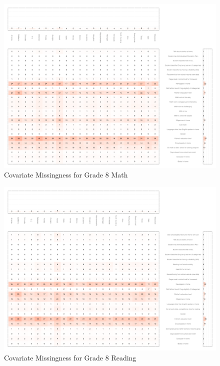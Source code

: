 \documentclass[letterpaper,12p,twoside]{article} %
\begin{document}
\begin{figure}[h]
\begin{center}
\includegraphics[width=\textwidth]{../Figures2009/g8math-missing.pdf}
\caption{Covariate Missingness for Grade 8 Math}
\label{fig:g8math:missing}
\end{center}
\end{figure}

\begin{figure}[h]
\begin{center}
\includegraphics[width=\textwidth]{../Figures2009/g8read-missing.pdf}
\caption{Covariate Missingness for Grade 8 Reading}
\label{fig:g8reading:missing}
\end{center}
\end{figure}
\end{document}
